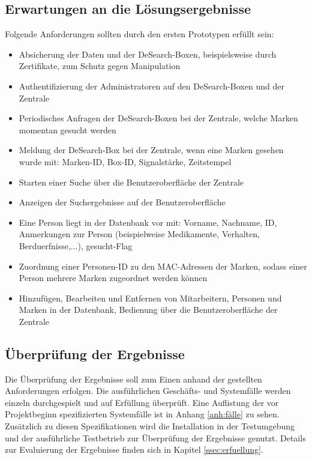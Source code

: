 \subsection{Erwartungen an die Lösungsergebnisse}
Folgende Anforderungen sollten durch den ersten Prototypen erfüllt sein:
\begin{itemize}
	\item  Absicherung der Daten und der DeSearch-Boxen, beispielsweise durch Zertifikate, zum Schutz gegen Manipulation
	\item Authentifizierung der Administratoren auf den DeSearch-Boxen und der Zentrale 
	\item Periodisches Anfragen der DeSearch-Boxen bei der Zentrale, welche Marken momentan gesucht werden
	\item Meldung der DeSearch-Box bei der Zentrale, wenn eine Marken gesehen wurde mit: Marken-ID, Box-ID, Signalstärke, Zeitstempel
	\item Starten einer Suche über die Benutzeroberfläche der Zentrale
	\item Anzeigen der Suchergebnisse auf der Benutzeroberfläche
	\item Eine Person liegt in der Datenbank vor mit: Vorname, Nachname, ID, Anmerkungen zur Person (beispielweise Medikamente, Verhalten, Berduerfnisse,...), gesucht-Flag
	\item Zuordnung einer Personen-ID zu den MAC-Adressen der Marken, sodass einer Person mehrere Marken zugeordnet werden können
	\item Hinzufügen, Bearbeiten und Entfernen von Mitarbeitern, Personen und Marken in der Datenbank, Bedienung über die Benutzeroberfläche der Zentrale
\end{itemize}


\subsection{Überprüfung der Ergebnisse}
Die Überprüfung der Ergebnisse soll zum Einen anhand der gestellten Anforderungen erfolgen. Die ausführlichen Geschäfts- und Systemfälle werden einzeln durchgespielt und auf Erfüllung überprüft. Eine Auflistung der vor Projektbeginn spezifizierten Systemfälle ist in Anhang \ref{anh:fälle} zu sehen. Zusätzlich zu diesen Spezifikationen wird die Installation in der Testumgebung und der ausführliche Testbetrieb zur Überprüfung der Ergebnisse genutzt. Details zur Evaluierung der Ergebnisse finden sich in Kapitel \ref{ssec:erfuellung}.










